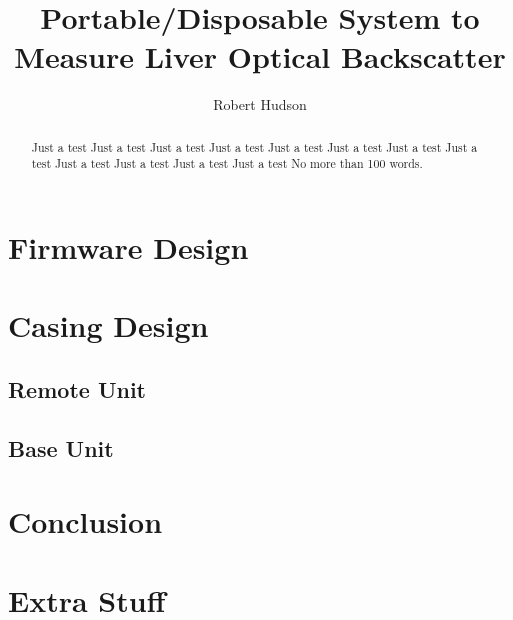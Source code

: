 \documentclass[draft]{IIBproject}
\begin{document}
\author{Robert Hudson}
\title{Portable/Disposable System to Measure Liver Optical Backscatter}
\maketitle
\thispagestyle{empty}


\begin{abstract}
Just a test Just a test Just a test Just a test Just a test Just a test 
Just a test Just a test Just a test Just a test Just a test Just a test 
No more than 100 words.
\end{abstract}

\newpage
\tableofcontents
\newpage
\pagestyle{plain}


%


%


%






\section{Firmware Design}

\section{Casing Design}

\subsection{Remote Unit}

\subsection{Base Unit}

\section{Conclusion}



\newpage


%

\appendix

\section{Extra Stuff}
\end{document}
